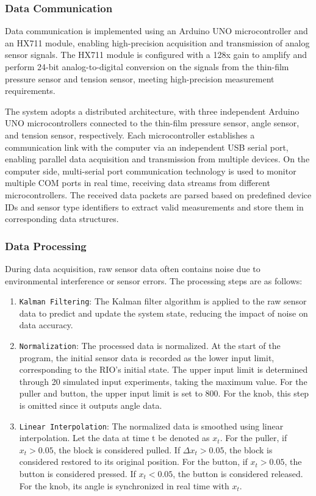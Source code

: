 \subsubsection{Data Communication}
Data communication is implemented using an Arduino UNO microcontroller and an HX711 module, enabling high-precision acquisition and transmission of analog sensor signals. The HX711 module is configured with a 128x gain to amplify and perform 24-bit analog-to-digital conversion on the signals from the thin-film pressure sensor and tension sensor, meeting high-precision measurement requirements.

The system adopts a distributed architecture, with three independent Arduino UNO microcontrollers connected to the thin-film pressure sensor, angle sensor, and tension sensor, respectively. Each microcontroller establishes a communication link with the computer via an independent USB serial port, enabling parallel data acquisition and transmission from multiple devices. On the computer side, multi-serial port communication technology is used to monitor multiple COM ports in real time, receiving data streams from different microcontrollers. The received data packets are parsed based on predefined device IDs and sensor type identifiers to extract valid measurements and store them in corresponding data structures.

\subsubsection{Data Processing}
During data acquisition, raw sensor data often contains noise due to environmental interference or sensor errors. The processing steps are as follows:

\begin{enumerate}
  \item {\texttt{Kalman Filtering}}: The Kalman filter algorithm is applied to the raw sensor data to predict and update the system state, reducing the impact of noise on data accuracy.

  \item {\texttt{Normalization}}: The processed data is normalized. At the start of the program, the initial sensor data is recorded as the lower input limit, corresponding to the RIO's initial state. The upper input limit is determined through 20 simulated input experiments, taking the maximum value. For the puller and button, the upper input limit is set to 800. For the knob, this step is omitted since it outputs angle data.

  \item {\texttt{Linear Interpolation}}: The normalized data is smoothed using linear interpolation. Let the data at time t be denoted as $x_{t}$. For the puller, if $x_{t}  > 0.05$, the block is considered pulled. If $\Delta x_{t} > 0.05$, the block is considered restored to its original position. For the button, if $x_{t}  > 0.05$, the button is considered pressed. If $x_{t} < 0.05$, the button is considered released. For the knob, its angle is synchronized in real time with $x_{t}$.
\end{enumerate}

